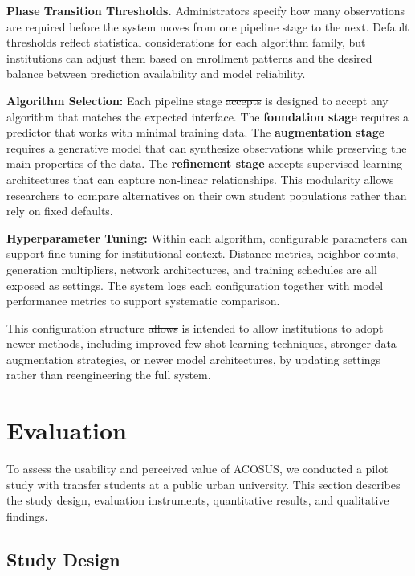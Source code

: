 \documentclass[letterpaper,11pt]{article}
\newcommand{\DIFdel}[1]{%
  \begingroup\setlength{\fboxsep}{0.5pt}%
  \colorbox{diffdelbg}{\textcolor{diffdeltext}{\sout{#1}}}%
  \endgroup}
\newcommand{\DIFadd}[1]{%
  \begingroup\setlength{\fboxsep}{0.5pt}%
  \colorbox{diffaddbg}{\textcolor{diffaddtext}{#1}}%
  \endgroup}
\begin{document}
\textbf{Phase Transition Thresholds.} Administrators specify how many observations are required before the system moves from one pipeline stage to the next. Default thresholds reflect statistical considerations for each algorithm family, but institutions can adjust them based on enrollment patterns and the desired balance between prediction availability and model reliability.

\textbf{Algorithm Selection:} Each pipeline stage \DIFdel{accepts} \DIFadd{is} \DIFadd{designed} \DIFadd{to} \DIFadd{accept} any algorithm that matches the expected interface. The \textbf{foundation stage} requires a predictor that works with minimal training data. The \textbf{augmentation stage} requires a generative model that can synthesize observations while preserving the main properties of the data. The \textbf{refinement stage} accepts supervised learning architectures that can capture non-linear relationships. This modularity allows researchers to compare alternatives on their own student populations rather than rely on fixed defaults.

\textbf{Hyperparameter Tuning:} Within each algorithm, configurable parameters \DIFadd{can} support fine-tuning for institutional context. Distance metrics, neighbor counts, generation multipliers, network architectures, and training schedules are all exposed as settings. The system logs each configuration together with model performance metrics to support systematic comparison.

This configuration structure \DIFdel{allows} \DIFadd{is} \DIFadd{intended} \DIFadd{to} \DIFadd{allow} institutions to adopt newer methods, including improved few-shot learning techniques, stronger data augmentation strategies, or newer model architectures, by updating settings rather than reengineering the full system.

\section{Evaluation}\label{sec:evaluation}

To assess the usability and perceived value of ACOSUS, we conducted a pilot study with transfer students at a public urban university. This section describes the study design, evaluation instruments, quantitative results, and qualitative findings.

\subsection{Study Design}\label{subsec:studydesign}
\end{document}
